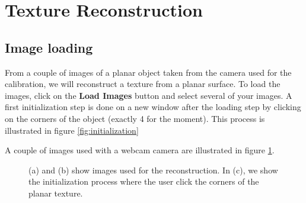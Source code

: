 \documentclass[12pt]{article}
\begin{document}
\section{Texture Reconstruction}
\label{sec:texture}
\subsection{Image loading}
From a couple of images of a planar object taken from the camera used for the calibration, we will reconstruct a texture from a planar surface.
To load the images, click on the \textbf{Load Images} button and select several of your images. 
 A first initialization step is done on a new window after the loading step by clicking on the corners of the object (exactly 4 for the moment). This process is illustrated in figure \ref{fig:initialization}

A couple of images used with a webcam camera are illustrated in figure \ref{fig:recon_webcam}.
\begin{figure}[!ht]
    \centering
\caption{(a) and (b) show images used for the reconstruction. In (c), we show the initialization process where the user click the corners of the planar texture.}
\label{fig:recon_webcam}
\end{figure}
\end{document}

